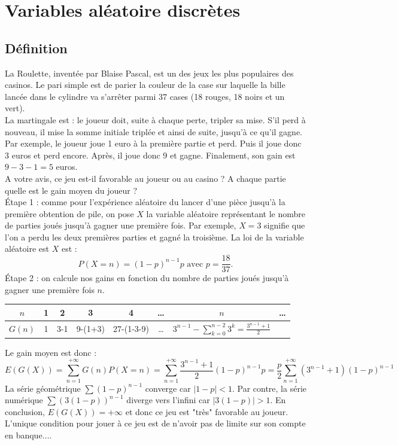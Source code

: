 \documentclass{book}
\begin{document}
\section{Variables aléatoire discrètes}

\subsection{Définition}
\begin{Exemple}La Roulette, inventée par Blaise Pascal, est un des jeux les plus populaires des casinos. Le pari simple est de parier la couleur de la case sur laquelle la bille lancée dans le cylindre va s'arrêter parmi 37 cases (18 rouges, 18 noirs et un vert).\\
La martingale est : le joueur doit, suite à chaque perte, tripler sa mise. S'il perd à nouveau, il mise la somme initiale triplée et ainsi de suite, jusqu'à ce qu'il gagne. Par exemple, le joueur joue 1 euro à la première partie et perd. Puis il joue donc 3 euros et  perd encore. Après, il joue donc 9 et gagne. Finalement, son gain est $9-3-1=5$ euros.\\  
A votre avis, ce jeu est-il favorable au joueur ou au casino ? A chaque partie quelle est le gain moyen du joueur ?\\
\'Etape 1 : comme pour l'expérience aléatoire du lancer d'une pièce jusqu'à la première obtention de pile, on pose $X$ la variable aléatoire représentant le nombre de parties joués jusqu'à gagner une première fois. Par exemple, $X=3$ signifie que l'on a perdu les deux premières parties et gagné la troisième. La loi de la variable aléatoire est $X$ est :
$$P(X=n)=(1-p)^{n-1} p\text{ avec } p=\frac{18}{37}.$$
\'Etape 2 :  on calcule nos gains en fonction du nombre de parties joués jusqu'à gagner une première fois  $n$.
\begin{center}
\begin{tabular}{|c||c|c|c|c|c|c|c|}
\hline
$n$ & 1 & 2  & 3&       4        & \dots & $n$& \dots  \\\hline
$G(n)$ & 1 & 3-1& 9-(1+3)&27-(1-3-9)&\dots  &$3^{n-1}-\sum_{k=0}^{n-2}3^k=\frac{3^{n-1}+1}{2}$& \\\hline
\end{tabular}
 \end{center}
Le gain moyen est donc :
$$E(G(X))=\sum_{n=1}^{+\infty}G(n)P(X=n)=\sum_{n=1}^{+\infty} \frac{3^{n-1}+1}{2}  (1-p)^{n-1} p=\frac p 2 \sum_{n=1}^{+\infty} (3^{n-1}+1)  (1-p)^{n-1}$$
La série géométrique $\sum (1-p)^{n-1}$ converge car $|1-p|<1$. Par contre, la série numérique  $\sum (3(1-p))^{n-1}$ diverge vers l'infini car $|3(1-p)|>1$. En conclusion, $E(G(X))=+\infty$ et donc ce jeu est "très" favorable au joueur. L'unique condition pour jouer à ce jeu est de n'avoir pas de limite sur son compte en banque$\dots$.  
\end{Exemple}
\end{document}
